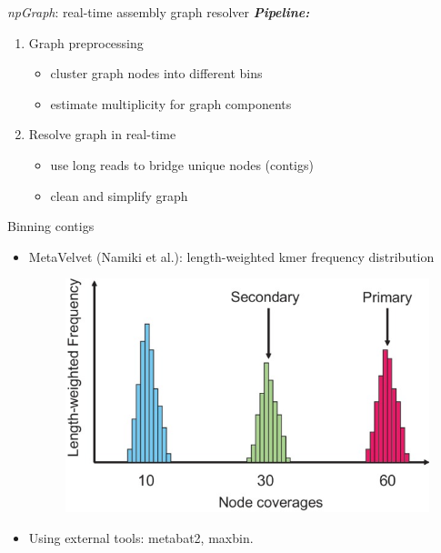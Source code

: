 \documentclass{beamer}
\begin{document}
\begin{frame}{\emph{npGraph}: real-time assembly graph resolver}
\emph{\textbf{Pipeline:}}
\begin{enumerate}
  \item Graph preprocessing
  \begin{itemize}
    \item cluster graph nodes into different bins
    \item estimate multiplicity for graph components
  \end{itemize}
  \item Resolve graph in real-time
  \begin{itemize}
  	\item use long reads to bridge unique nodes (contigs)
  	\item clean and simplify graph
  \end{itemize}
\end{enumerate}
\end{frame}
\begin{frame}{Binning contigs}
\begin{itemize}
	\item MetaVelvet (Namiki et al.): length-weighted kmer frequency distribution
		\begin{figure}[!hpb]
		\centering
		\includegraphics[width=.45\textwidth]{figures/metavelvet.jpg}
		\end{figure}
	\item Using external tools: metabat2, maxbin.
\end{itemize}
\end{frame}
\end{document}
